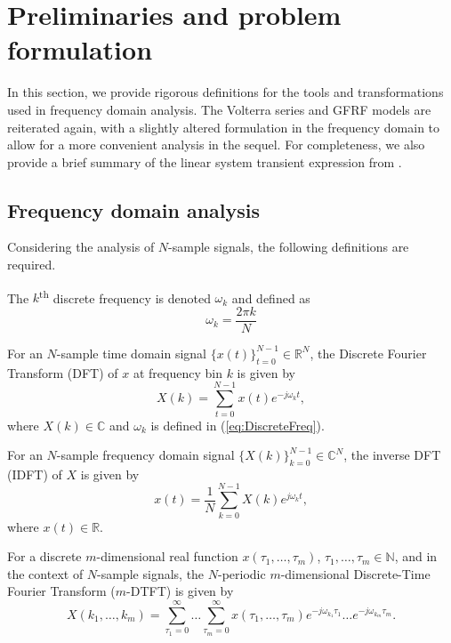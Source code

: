 \section{Preliminaries and problem formulation}

In this section, we provide rigorous definitions for the tools and transformations used in frequency domain analysis. The Volterra series and GFRF models are reiterated again, with a slightly altered formulation in the frequency domain to allow for a more convenient analysis in the sequel. For completeness, we also provide a brief summary of the linear system transient expression from \cite{Lataire2016}. 

\subsection{Frequency domain analysis}

Considering the analysis of $N$-sample signals, the following definitions are required.

\begin{defn}[$\omega_k$]
The $k$\textsuperscript{th} discrete frequency is denoted $\omega_k$ and defined as
\begin{equation}
\label{eq:DiscreteFreq}
\omega_k = \frac{2 \pi k}{N}
\end{equation}
\end{defn}

\begin{defn}[DFT]
For an $N$-sample time domain signal $\{x(t)\}_{t=0}^{N-1} \in \mathbb{R}^N$, the Discrete Fourier Transform (DFT) of $x$ at frequency bin $k$ is given by
\begin{equation}
X(k) = \sum_{t=0}^{N-1} x(t) e^{-j \omega_{k} t},
\end{equation}
where $X(k) \in \mathbb{C}$ and $\omega_{k}$ is defined in (\ref{eq:DiscreteFreq}).
\end{defn}

\begin{defn}[IDFT]
For an $N$-sample frequency domain signal $\{X(k)\}_{k=0}^{N-1} \in \mathbb{C}^N$, the inverse DFT (IDFT) of $X$ is given by
\begin{equation}
x(t) = \frac{1}{N} \sum_{k=0}^{N-1} X(k) e^{j \omega_{k} t},
\end{equation}
where $x(t) \in \mathbb{R}$.
\end{defn}

\begin{defn}
For a discrete $m$-dimensional real function $x(\tau_1,\hdots,\tau_m)$, $\tau_1,\hdots,\tau_m \in \mathbb{N}$, and in the context of $N$-sample signals, the $N$-periodic $m$-dimensional Discrete-Time Fourier Transform ($m$-DTFT) is given by
\begin{equation}
X(k_1,\hdots,k_m) = \sum_{\tau_1=0}^{\infty} \hdots \sum_{\tau_m=0}^{\infty} x(\tau_1,\hdots,\tau_m) e^{-j \omega_{k_1} \tau_1} \hdots e^{-j \omega_{k_m} \tau_m}.
\end{equation}
\end{defn}

